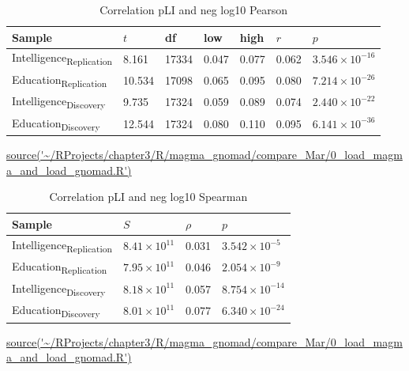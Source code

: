 \begin{table}[ht]
\centering
\setlength{\extrarowheight}{2pt}
\begin{tabular}{lllllll}
  \toprule
Sample & $t$ & df & low & high & $r$ & $p$ \\ 
\midrule
Intelligence\textsubscript{Replication} & 8.161 & 17334 & 0.047 & 0.077 & 0.062 & $3.546 \times 10^{-16}$ \\ 
  Education\textsubscript{Replication} & 10.534 & 17098 & 0.065 & 0.095 & 0.080 & $7.214 \times 10^{-26}$ \\ 
  Intelligence\textsubscript{Discovery} & 9.735 & 17324 & 0.059 & 0.089 & 0.074 & $2.440 \times 10^{-22}$ \\ 
  Education\textsubscript{Discovery} & 12.544 & 17324 & 0.080 & 0.110 & 0.095 & $6.141 \times 10^{-36}$ \\ 
   \bottomrule
\end{tabular}
\caption{Correlation pLI and neg log10 Pearson } 
\tiny\url{source('~/RProjects/chapter3/R/magma_gnomad/compare_Mar/0_load_magma_and_load_gnomad.R')}
\label{tab: Correlation pLI and neg log10 Pearson}
\end{table}




\begin{table}[ht]
\centering
\setlength{\extrarowheight}{2pt}
\begin{tabular}{llll}
  \toprule
Sample & $S$ & $\rho$ & $p$ \\ 
  \midrule
Intelligence\textsubscript{Replication} & $8.41 \times 10^{11}$ & 0.031 & $3.542 \times 10^{-5}$ \\ 
  Education\textsubscript{Replication} & $7.95 \times 10^{11}$ & 0.046 & $2.054 \times 10^{-9}$ \\ 
  Intelligence\textsubscript{Discovery} & $8.18 \times 10^{11}$ & 0.057 & $8.754 \times 10^{-14}$ \\ 
  Education\textsubscript{Discovery} & $8.01 \times 10^{11}$ & 0.077 & $6.340 \times 10^{-24}$ \\ 
   \bottomrule
\end{tabular}
\caption{Correlation pLI and neg log10 Spearman } 
\tiny\url{source('~/RProjects/chapter3/R/magma_gnomad/compare_Mar/0_load_magma_and_load_gnomad.R')}
\label{tab: Correlation pLI and neg log10 Spearman}
\end{table}




